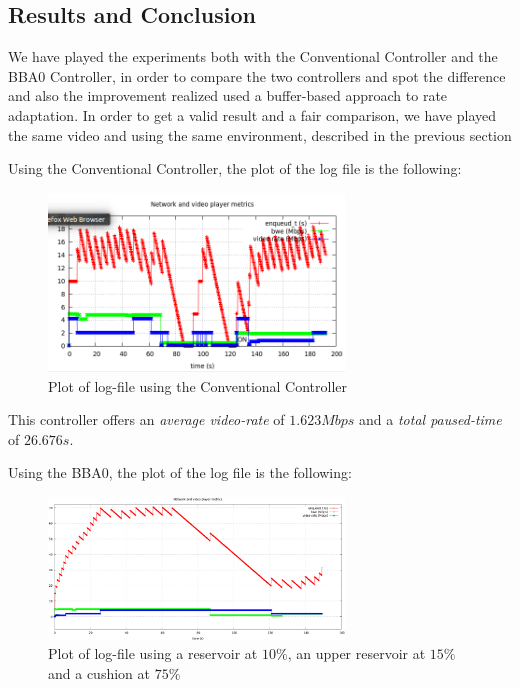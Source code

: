 \documentclass[a4paper]{report}
\begin{document}
\subsection{Results and Conclusion}

We have played the experiments both with the Conventional Controller and the BBA0 Controller, in order to compare the two controllers and spot the difference and also the improvement realized used a buffer-based approach to rate adaptation.
In order to get a valid result and a fair comparison, we have played the same video and using the same environment, described in the previous section

Using the Conventional Controller, the plot of the log file is the following:

\begin{figure}[H]
  \begin{center}
    \includegraphics[width=0.7\textwidth]{conventionalcontroller}
  \end{center}
  \caption{Plot of log-file using the Conventional Controller}\label{fig:conventional}
\end{figure}

This controller offers an \textit{average video-rate} of $1.623 Mbps$ and a \textit{total paused-time} of $26.676 s$.


Using the BBA0, the plot of the log file is the following:

\begin{figure}[H]
  \begin{center}
    \includegraphics[width=0.7\textwidth]{res_ten_cushion_seventyfive}
  \end{center}
  \caption{Plot of log-file using a reservoir at $10\%$, an upper reservoir at $15\%$ and a cushion at $75\%$}
  \label{fig:bba01}
\end{figure}
\end{document}
